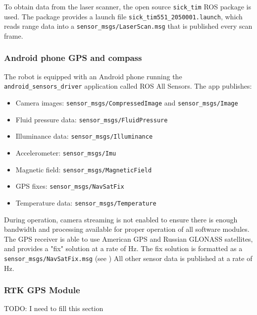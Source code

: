 \documentclass[titlepage,12pt,a4paper]{article}
\begin{document}
To obtain data from the laser scanner, the open source \verb|sick_tim| ROS package is used. The package provides a launch file \verb|sick_tim551_2050001.launch|, which reads range data into a \verb|sensor_msgs/LaserScan.msg| that is published every scan frame.

\subsubsection{Android phone GPS and compass}

The robot is equipped with an Android phone running the \verb|android_sensors_driver| application called ROS All Sensors. The app publishes:

\begin{itemize}
	\item Camera images: \verb|sensor_msgs/CompressedImage| and \verb|sensor_msgs/Image|
	\item Fluid pressure data: \verb|sensor_msgs/FluidPressure|
	\item Illuminance data: \verb|sensor_msgs/Illuminance|
	\item Accelerometer: \verb|sensor_msgs/Imu|
	\item Magnetic field: \verb|sensor_msgs/MagneticField|
	\item GPS fixes: \verb|sensor_msgs/NavSatFix|
	\item Temperature data: \verb|sensor_msgs/Temperature| \\
\end{itemize}

During operation, camera streaming is not enabled to ensure there is enough bandwidth and processing available for proper operation of all software modules. The GPS receiver is able to use American GPS and Russian GLONASS satellites, and provides a "fix" solution at a rate of \unit[1]{Hz}. The fix solution is formatted as a \verb|sensor_msgs/NavSatFix.msg| (see ) All other sensor data is published at a rate of \unit[20]{Hz}.

\subsubsection{RTK GPS Module}

TODO: I need to fill this section
\end{document}
